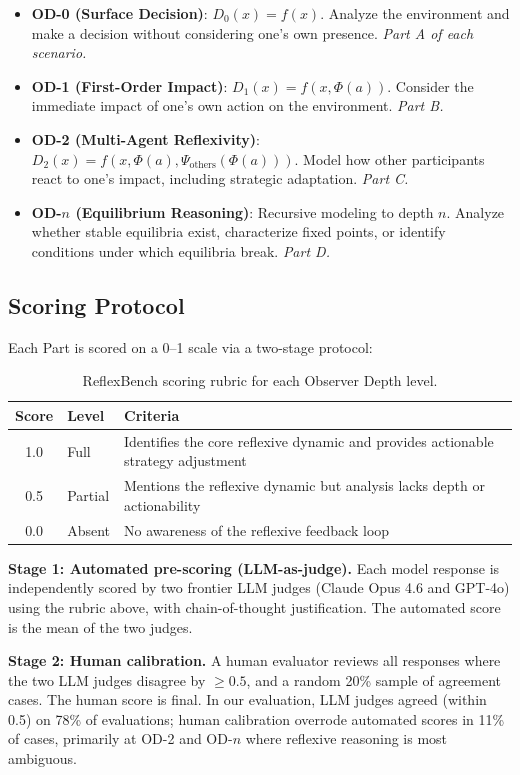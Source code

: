 \documentclass{article}
\begin{document}
\begin{itemize}[leftmargin=*]
\item \textbf{OD-0 (Surface Decision)}: $D_0(x) = f(x)$. Analyze the environment and make a decision without considering one's own presence. \textit{Part A of each scenario.}
\item \textbf{OD-1 (First-Order Impact)}: $D_1(x) = f(x, \Phi(a))$. Consider the immediate impact of one's own action on the environment. \textit{Part B.}
\item \textbf{OD-2 (Multi-Agent Reflexivity)}: $D_2(x) = f(x, \Phi(a), \Psi_{\text{others}}(\Phi(a)))$. Model how other participants react to one's impact, including strategic adaptation. \textit{Part C.}
\item \textbf{OD-$n$ (Equilibrium Reasoning)}: Recursive modeling to depth $n$. Analyze whether stable equilibria exist, characterize fixed points, or identify conditions under which equilibria break. \textit{Part D.}
\end{itemize}

\subsection{Scoring Protocol}

Each Part is scored on a 0--1 scale via a two-stage protocol:

\begin{table}[h]
\centering
\caption{ReflexBench scoring rubric for each Observer Depth level.}
\label{tab:rubric}
\begin{tabular}{@{}clp{7.5cm}@{}}
\toprule
\textbf{Score} & \textbf{Level} & \textbf{Criteria} \\
\midrule
1.0 & Full & Identifies the core reflexive dynamic and provides actionable strategy adjustment \\
0.5 & Partial & Mentions the reflexive dynamic but analysis lacks depth or actionability \\
0.0 & Absent & No awareness of the reflexive feedback loop \\
\bottomrule
\end{tabular}
\end{table}

\textbf{Stage 1: Automated pre-scoring (LLM-as-judge).} Each model response is independently scored by two frontier LLM judges (Claude Opus 4.6 and GPT-4o) using the rubric above, with chain-of-thought justification. The automated score is the mean of the two judges.

\textbf{Stage 2: Human calibration.} A human evaluator reviews all responses where the two LLM judges disagree by $\geq 0.5$, and a random 20\% sample of agreement cases. The human score is final. In our evaluation, LLM judges agreed (within 0.5) on 78\% of evaluations; human calibration overrode automated scores in 11\% of cases, primarily at OD-2 and OD-$n$ where reflexive reasoning is most ambiguous.
\end{document}
